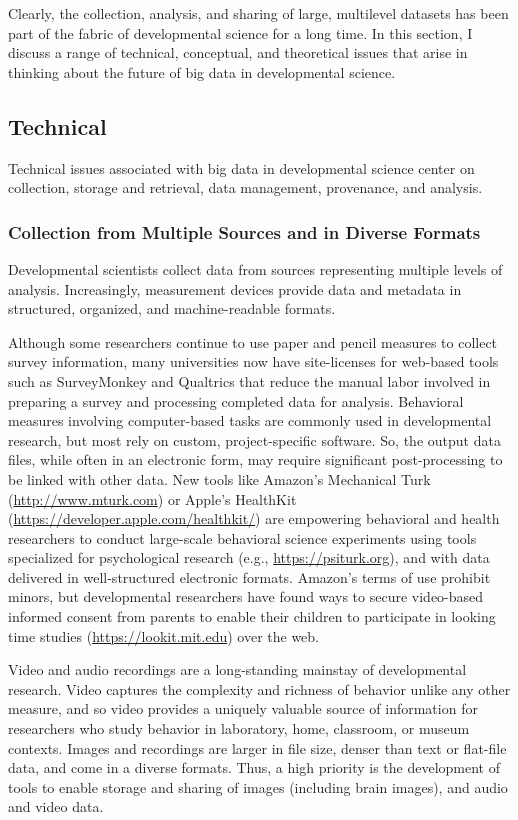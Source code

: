 \documentclass[letterpaper,man,apacite,natbib]{apa6}
\begin{document}
Clearly, the collection, analysis, and sharing of large, multilevel datasets has been part of the fabric of developmental science for a long time.
In this section, I discuss a range of technical, conceptual, and theoretical issues that arise in thinking about the future of big data in developmental science. 

\subsection{Technical}

Technical issues associated with big data in developmental science center on collection, storage and retrieval, data management, provenance, and analysis. 

\subsubsection{Collection from Multiple Sources and in Diverse Formats}

Developmental scientists collect data from sources representing multiple levels of analysis.
Increasingly, measurement devices provide data and metadata in structured, organized, and machine-readable formats.

Although some researchers continue to use paper and pencil measures to collect survey information, many universities now have site-licenses for web-based tools such as SurveyMonkey and Qualtrics that  reduce the manual labor involved in preparing a survey and processing completed data for analysis. 
Behavioral measures involving computer-based tasks are commonly used in developmental research, but most rely on custom, project-specific software.
So, the output data files, while often in an electronic form, may require significant post-processing to be linked with other data.
New tools like Amazon's Mechanical Turk (\url{http://www.mturk.com}) or Apple's HealthKit (\url{https://developer.apple.com/healthkit/}) are empowering behavioral and health researchers to conduct large-scale behavioral science experiments using tools specialized for psychological research (e.g., \url{https://psiturk.org}), and with data delivered in well-structured electronic formats.
Amazon's terms of use prohibit minors, but developmental researchers have found ways to secure video-based informed consent from parents to enable their children to participate in looking time studies (\url{https://lookit.mit.edu}) over the web.

Video and audio recordings are a long-standing mainstay of developmental research.
Video captures the complexity and richness of behavior unlike any other measure, and so video provides a uniquely valuable source of information for researchers who study behavior in laboratory, home, classroom, or museum contexts. 
Images and recordings are larger in file size, denser than text or flat-file data, and come in a diverse formats. 
Thus, a high priority is the development of tools to enable storage and sharing of images (including brain images), and audio and video data. 
\end{document}
